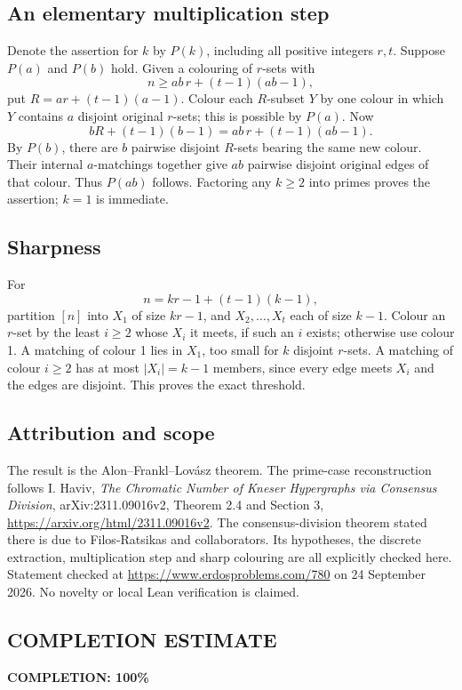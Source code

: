 \subsection*{An elementary multiplication step}
Denote the assertion for \(k\) by \(P(k)\), including all positive integers \(r,t\). Suppose \(P(a)\) and \(P(b)\) hold. Given a colouring of \(r\)-sets with
\[
n\geq ab\,r+(t-1)(ab-1),
\]
put \(R=ar+(t-1)(a-1)\). Colour each \(R\)-subset \(Y\) by one colour in which \(Y\) contains \(a\) disjoint original \(r\)-sets; this is possible by \(P(a)\). Now
\[
bR+(t-1)(b-1)=ab\,r+(t-1)(ab-1).
\]
By \(P(b)\), there are \(b\) pairwise disjoint \(R\)-sets bearing the same new colour. Their internal \(a\)-matchings together give \(ab\) pairwise disjoint original edges of that colour. Thus \(P(ab)\) follows. Factoring any \(k\geq2\) into primes proves the assertion; \(k=1\) is immediate.

\subsection*{Sharpness}
For
\[
n=kr-1+(t-1)(k-1),
\]
partition \([n]\) into \(X_1\) of size \(kr-1\), and \(X_2,\ldots,X_t\) each of size \(k-1\). Colour an \(r\)-set by the least \(i\geq2\) whose \(X_i\) it meets, if such an \(i\) exists; otherwise use colour 1.
A matching of colour 1 lies in \(X_1\), too small for \(k\) disjoint \(r\)-sets. A matching of colour \(i\geq2\) has at most \(|X_i|=k-1\) members, since every edge meets \(X_i\) and the edges are disjoint. This proves the exact threshold.

\subsection*{Attribution and scope}
The result is the Alon--Frankl--Lov\'asz theorem. The prime-case reconstruction follows I. Haviv, \emph{The Chromatic Number of Kneser Hypergraphs via Consensus Division}, arXiv:2311.09016v2, Theorem 2.4 and Section 3, \url{https://arxiv.org/html/2311.09016v2}. The consensus-division theorem stated there is due to Filos-Ratsikas and collaborators. Its hypotheses, the discrete extraction, multiplication step and sharp colouring are all explicitly checked here. Statement checked at \url{https://www.erdosproblems.com/780} on 24 September 2026. No novelty or local Lean verification is claimed.
\subsection*{COMPLETION ESTIMATE}
\textbf{COMPLETION: 100\%}
